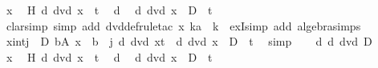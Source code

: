 \begin{isabellebody}
\ x\ \isamarkupfalse%
\ H{\isacharcolon}{\kern0pt}\ {\isachardoublequoteopen}d\ dvd\ x\ {\isacharplus}{\kern0pt}\ t{\isachardoublequoteclose}\ \isamarkupfalse%
\ d\ \isamarkupfalse%
\ {\isachardoublequoteopen}d\ dvd\ {\isacharparenleft}{\kern0pt}x\ {\isacharplus}{\kern0pt}\ D{\isacharparenright}{\kern0pt}\ {\isacharplus}{\kern0pt}\ t{\isachardoublequoteclose}\isanewline
\ \ \ \ \ \ \isamarkupfalse%
\ {\isacharparenleft}{\kern0pt}clarsimp\ simp\ add{\isacharcolon}{\kern0pt}\ dvd{\isacharunderscore}{\kern0pt}def{\isacharcomma}{\kern0pt}rule{\isacharunderscore}{\kern0pt}tac\ x{\isacharequal}{\kern0pt}\ {\isachardoublequoteopen}ka\ {\isacharplus}{\kern0pt}\ k{\isachardoublequoteclose}\ \ exI{\isacharcomma}{\kern0pt}simp\ add{\isacharcolon}{\kern0pt}\ algebra{\isacharunderscore}{\kern0pt}simps{\isacharparenright}{\kern0pt}\isacommand{{\isacharbraceright}{\kern0pt}}\isamarkupfalse%
\isanewline
\ \ \isamarkupfalse%
\ {\isachardoublequoteopen}{\isasymforall}{\isacharparenleft}{\kern0pt}x{\isacharcolon}{\kern0pt}{\isacharcolon}{\kern0pt}int{\isacharparenright}{\kern0pt}{\isachardot}{\kern0pt}{\isacharparenleft}{\kern0pt}{\isasymforall}j{\isasymin}{\isacharbraceleft}{\kern0pt}{}\ {\isachardot}{\kern0pt}{\isachardot}{\kern0pt}\ D{\isacharbraceright}{\kern0pt}{\isachardot}{\kern0pt}\ {\isasymforall}b{\isasymin}A{\isachardot}{\kern0pt}\ x\ {\isasymnoteq}\ b\ {\isacharminus}{\kern0pt}\ j{\isacharparenright}{\kern0pt}{\isasymlongrightarrow}\ {\isacharparenleft}{\kern0pt}d\ dvd\ x{\isacharplus}{\kern0pt}t{\isacharparenright}{\kern0pt}\ {\isasymlongrightarrow}\ {\isacharparenleft}{\kern0pt}d\ dvd\ {\isacharparenleft}{\kern0pt}x\ {\isacharplus}{\kern0pt}\ D{\isacharparenright}{\kern0pt}\ {\isacharplus}{\kern0pt}\ t{\isacharparenright}{\kern0pt}{\isachardoublequoteclose}\ \isamarkupfalse%
\ simp\isanewline
{}\isamarkupfalse%
\isanewline
\ \ \isamarkupfalse%
\ d{\isacharcolon}{\kern0pt}\ {\isachardoublequoteopen}d\ dvd\ D{\isachardoublequoteclose}\isanewline
\ \ \isacommand{{\isacharbraceleft}{\kern0pt}}\isamarkupfalse%
\isamarkupfalse%
\ x\ \isamarkupfalse%
\ H{\isacharcolon}{\kern0pt}\ {\isachardoublequoteopen}{\isasymnot}{\isacharparenleft}{\kern0pt}d\ dvd\ x\ {\isacharplus}{\kern0pt}\ t{\isacharparenright}{\kern0pt}{\isachardoublequoteclose}\ \isamarkupfalse%
\ d\ \isamarkupfalse%
\ {\isachardoublequoteopen}{\isasymnot}d\ dvd\ {\isacharparenleft}{\kern0pt}x\ {\isacharplus}{\kern0pt}\ D{\isacharparenright}{\kern0pt}\ {\isacharplus}{\kern0pt}\ t{\isachardoublequoteclose}\isanewline

\end{isabellebody}
